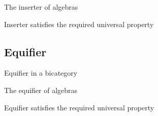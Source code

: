 \begin{definition}
The inserter of algebras
\end{definition}

\begin{proposition}
Inserter satisfies the required universal property
\end{proposition}

\subsection{Equifier}

\begin{definition}
Equifier in a bicategory
\end{definition}

\begin{definition}
The equifier of algebras
\end{definition}

\begin{proposition}
Equifier satisfies the required universal property
\end{proposition}
